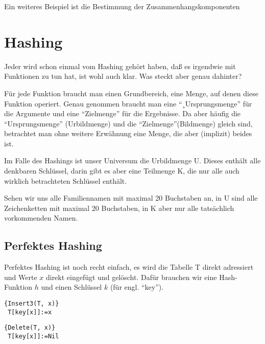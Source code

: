\documentclass[ngerman,draft,parskip=half*,twoside]{scrreprt}
\theoremstyle{break}
\theoremstyle{nonumberbreak}
\begin{document}
Ein weiteres Beispiel ist die Bestimmung der Zusammenhangskomponenten

\chapter{Hashing}
Jeder wird schon einmal vom Hashing gehört haben, daß es irgendwie mit Funktionen zu tun hat, ist wohl auch klar. Was
steckt aber genau dahinter?

Für jede Funktion braucht man einen Grundbereich, eine Menge, auf denen diese Funktion operiert. Genau genommen
braucht man eine "`¸Ursprungsmenge"' für die Argumente und eine "`Zielmenge"' für die Ergebnisse. Da aber häufig die
"`Ursprungsmenge"' (Urbildmenge) und die "`Zielmenge"'(Bildmenge) gleich sind, betrachtet man ohne weitere Erwähnung
eine Menge, die aber (implizit) beides ist.

Im Falle des Hashings ist unser Universum die Urbildmenge U. Dieses enthält alle denkbaren Schlüssel, darin gibt es
aber eine Teilmenge K, die nur alle auch wirklich betrachteten Schlüssel enthält.

Sehen wir uns alle Familiennamen mit maximal 20 Buchstaben an, in U sind alle Zeichenketten mit maximal 20 Buchstaben,
in K aber nur alle tatsächlich vorkommenden Namen.

\section{Perfektes Hashing}
Perfektes Hashing ist noch recht einfach, es wird die Tabelle T direkt adressiert und Werte $x$ direkt eingefügt und
gelöscht. Dafür brauchen wir eine Hash-Funktion $h$ und einen Schlüssel $k$ (für engl. "`key"').

\begin{Algorithmus}[H]
\begin{lstlisting}[frame=tlrb, mathescape=true, title=\textsc{Insert\textnormal{(T, x)}},gobble=1]{Insert3(T, x)}
 T[key[x]]:=x
\end{lstlisting}
\end{Algorithmus} 

\begin{Algorithmus}[H]
\begin{lstlisting}[frame=tlrb, mathescape=true, title=\textsc{Delete\textnormal{(T, x)}},gobble=1]{Delete(T, x)}
 T[key[x]]:=Nil
\end{lstlisting}
\end{Algorithmus}
\end{document}
